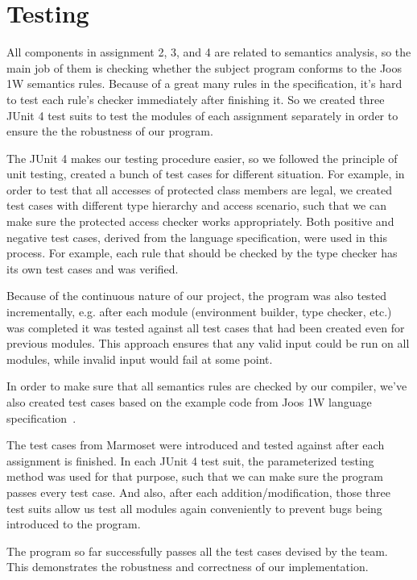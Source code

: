 \chapter{Testing}
\label{testing}
All components in assignment 2, 3, and 4 are related to semantics analysis, so the main job of them is checking whether the subject program conforms to the Joos 1W semantics rules. Because of a great many rules in the specification, it's hard to test each rule's checker immediately after finishing it. So we created three JUnit 4 test suits to test the modules of each assignment separately in order to ensure the the robustness of our program.  

The JUnit 4 makes our testing procedure easier, so we followed the principle of unit testing, created a bunch of test cases for different situation. For example, in order to test that all accesses of protected class members are legal, we created test cases with different type hierarchy and access scenario, such that we can make sure the protected access checker works appropriately. Both positive and negative test cases, derived from the language specification, were used in this process. For example, each rule that should be checked by the type checker has its own test cases and was verified.

Because of the continuous nature of our project, the program was also tested incrementally, e.g. after each module (environment builder, type checker, etc.) was completed it was tested against all test cases that had been created even for previous modules. This approach ensures that any valid input could be run on all modules, while invalid input would fail at some point. 

In order to make sure that all semantics rules are checked by our compiler, we've also created test cases based on the example code from Joos 1W language specification~\cite{joos1w}.

The test cases from Marmoset were introduced and tested against after each assignment is finished. In each JUnit 4 test suit, the parameterized testing method was used for that purpose, such that we can make sure the program passes every test case. And also, after each addition/modification, those three test suits allow us test all modules again conveniently to prevent bugs being introduced to the program.   

The program so far successfully passes all the test cases devised by the team. This demonstrates the robustness and correctness of our implementation. 